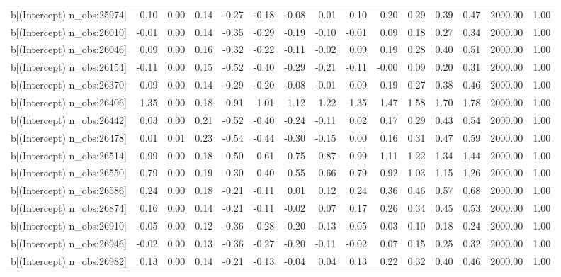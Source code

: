 \begin{table}[ht]
\begin{tabular}{rrrrrrrrrrrrrrr}
  b[(Intercept) n\_obs:25974] & 0.10 & 0.00 & 0.14 & -0.27 & -0.18 & -0.08 & 0.01 & 0.10 & 0.20 & 0.29 & 0.39 & 0.47 & 2000.00 & 1.00 \\ 
  b[(Intercept) n\_obs:26010] & -0.01 & 0.00 & 0.14 & -0.35 & -0.29 & -0.19 & -0.10 & -0.01 & 0.09 & 0.18 & 0.27 & 0.34 & 2000.00 & 1.00 \\ 
  b[(Intercept) n\_obs:26046] & 0.09 & 0.00 & 0.16 & -0.32 & -0.22 & -0.11 & -0.02 & 0.09 & 0.19 & 0.28 & 0.40 & 0.51 & 2000.00 & 1.00 \\ 
  b[(Intercept) n\_obs:26154] & -0.11 & 0.00 & 0.15 & -0.52 & -0.40 & -0.29 & -0.21 & -0.11 & -0.00 & 0.09 & 0.20 & 0.31 & 2000.00 & 1.00 \\ 
  b[(Intercept) n\_obs:26370] & 0.09 & 0.00 & 0.14 & -0.29 & -0.20 & -0.08 & -0.01 & 0.09 & 0.19 & 0.27 & 0.38 & 0.46 & 2000.00 & 1.00 \\ 
  b[(Intercept) n\_obs:26406] & 1.35 & 0.00 & 0.18 & 0.91 & 1.01 & 1.12 & 1.22 & 1.35 & 1.47 & 1.58 & 1.70 & 1.78 & 2000.00 & 1.00 \\ 
  b[(Intercept) n\_obs:26442] & 0.03 & 0.00 & 0.21 & -0.52 & -0.40 & -0.24 & -0.11 & 0.02 & 0.17 & 0.29 & 0.43 & 0.54 & 2000.00 & 1.00 \\ 
  b[(Intercept) n\_obs:26478] & 0.01 & 0.01 & 0.23 & -0.54 & -0.44 & -0.30 & -0.15 & 0.00 & 0.16 & 0.31 & 0.47 & 0.59 & 2000.00 & 1.00 \\ 
  b[(Intercept) n\_obs:26514] & 0.99 & 0.00 & 0.18 & 0.50 & 0.61 & 0.75 & 0.87 & 0.99 & 1.11 & 1.22 & 1.34 & 1.44 & 2000.00 & 1.00 \\ 
  b[(Intercept) n\_obs:26550] & 0.79 & 0.00 & 0.19 & 0.30 & 0.40 & 0.55 & 0.66 & 0.79 & 0.92 & 1.03 & 1.15 & 1.26 & 2000.00 & 1.00 \\ 
  b[(Intercept) n\_obs:26586] & 0.24 & 0.00 & 0.18 & -0.21 & -0.11 & 0.01 & 0.12 & 0.24 & 0.36 & 0.46 & 0.57 & 0.68 & 2000.00 & 1.00 \\ 
  b[(Intercept) n\_obs:26874] & 0.16 & 0.00 & 0.14 & -0.21 & -0.11 & -0.02 & 0.07 & 0.17 & 0.26 & 0.34 & 0.45 & 0.53 & 2000.00 & 1.00 \\ 
  b[(Intercept) n\_obs:26910] & -0.05 & 0.00 & 0.12 & -0.36 & -0.28 & -0.20 & -0.13 & -0.05 & 0.03 & 0.10 & 0.18 & 0.24 & 2000.00 & 1.00 \\ 
  b[(Intercept) n\_obs:26946] & -0.02 & 0.00 & 0.13 & -0.36 & -0.27 & -0.20 & -0.11 & -0.02 & 0.07 & 0.15 & 0.25 & 0.32 & 2000.00 & 1.00 \\ 
  b[(Intercept) n\_obs:26982] & 0.13 & 0.00 & 0.14 & -0.21 & -0.13 & -0.04 & 0.04 & 0.13 & 0.22 & 0.32 & 0.40 & 0.46 & 2000.00 & 1.00 \\ 

\end{tabular}
\end{table}
